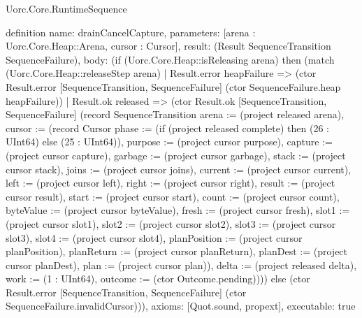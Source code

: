\begin{lexlean}{Uorc.Core.RuntimeSequence}
\begin{semanticmodule}
definition{
  name: drainCancelCapture,
  parameters: [arena : Uorc.Core.Heap::Arena, cursor : Cursor],
  result: (Result SequenceTransition SequenceFailure),
  body: (if (Uorc.Core.Heap::isReleasing arena) then (match (Uorc.Core.Heap::releaseStep arena)
    | Result.error heapFailure => (ctor Result.error [SequenceTransition, SequenceFailure] (ctor SequenceFailure.heap heapFailure))
    | Result.ok released => (ctor Result.ok [SequenceTransition, SequenceFailure] (record SequenceTransition {arena := (project released arena), cursor := (record Cursor {phase := (if (project released complete) then (26 : UInt64) else (25 : UInt64)), purpose := (project cursor purpose), capture := (project cursor capture), garbage := (project cursor garbage), stack := (project cursor stack), joins := (project cursor joins), current := (project cursor current), left := (project cursor left), right := (project cursor right), result := (project cursor result), start := (project cursor start), count := (project cursor count), byteValue := (project cursor byteValue), fresh := (project cursor fresh), slot1 := (project cursor slot1), slot2 := (project cursor slot2), slot3 := (project cursor slot3), slot4 := (project cursor slot4), planPosition := (project cursor planPosition), planReturn := (project cursor planReturn), planDest := (project cursor planDest), plan := (project cursor plan)}), delta := (project released delta), work := (1 : UInt64), outcome := (ctor Outcome.pending)}))) else (ctor Result.error [SequenceTransition, SequenceFailure] (ctor SequenceFailure.invalidCursor))),
  axioms: [Quot.sound, propext],
  executable: true
}


\end{semanticmodule}
\end{lexlean}
